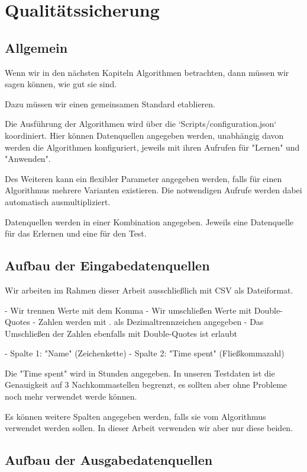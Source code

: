 \newpage{}

\section{Qualitätssicherung}

\subsection{Allgemein}

Wenn wir in den nächsten Kapiteln Algorithmen betrachten, dann müssen 
wir sagen können, wie gut sie sind. 

Dazu müssen wir einen gemeinsamen Standard etablieren.

Die Ausführung der Algorithmen wird über die `Scripts/configuration.json` 
koordiniert. Hier können Datenquellen angegeben werden, unabhängig davon 
werden die Algorithmen konfiguriert, jeweils mit ihren Aufrufen für "Lernen"
und "Anwenden". 

Des Weiteren kann ein flexibler Parameter angegeben werden, falls für einen Algorithmus
mehrere Varianten existieren. 
Die notwendigen Aufrufe werden dabei automatisch ausmultipliziert.

Datenquellen werden in einer Kombination angegeben. Jeweils eine Datenquelle für 
das Erlernen und eine für den Test. 

\subsection{Aufbau der Eingabedatenquellen}

Wir arbeiten im Rahmen dieser Arbeit ausschließlich mit CSV als Dateiformat. 

- Wir trennen Werte mit dem Komma
- Wir umschließen Werte mit Double-Quotes
- Zahlen werden mit . als Dezimaltrennzeichen angegeben
- Das Umschließen der Zahlen ebenfalls mit Double-Quotes ist erlaubt

- Spalte 1: "Name" (Zeichenkette)
- Spalte 2: "Time spent" (Fließkommazahl)

Die "Time spent" wird in Stunden angegeben. 
In unseren Testdaten ist die Genauigkeit auf 3 Nachkommastellen begrenzt, 
es sollten aber ohne Probleme noch mehr verwendet werde können.

Es können weitere Spalten angegeben werden, falls sie vom Algorithmus verwendet 
werden sollen. In dieser Arbeit verwenden wir aber nur diese beiden. 

\subsection{Aufbau der Ausgabedatenquellen}

